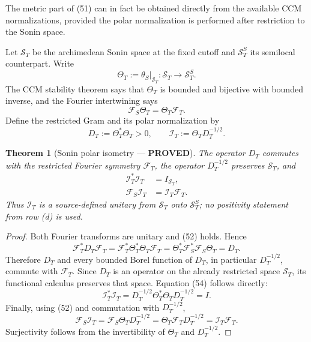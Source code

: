 \documentclass[11pt]{article}
\newtheorem{theorem}{Theorem}
\newcommand{\PROVED}{\textcolor{green!45!black}{\textbf{PROVED}}}
\begin{document}
The metric part of (51) can in fact be obtained directly from the available
CCM normalizations, provided the polar normalization is performed after
restriction to the Sonin space.

Let $\mathcal S_T$ be the archimedean Sonin space at the fixed cutoff and
$\mathcal S_T^S$ its semilocal counterpart.  Write
\[
 \Theta_T:=\theta_S|_{\mathcal S_T}:\mathcal S_T
 \longrightarrow\mathcal S_T^S.
\]
The CCM stability theorem says that $\Theta_T$ is bounded and bijective with
bounded inverse, and the Fourier intertwining says
\begin{equation}
 \mathcal F_S\Theta_T=\Theta_T\mathcal F_T.              \tag{52}
\end{equation}
Define the restricted Gram and its polar normalization by
\begin{equation}
 D_T:=\Theta_T^*\Theta_T>0,\qquad
 \mathcal I_T:=\Theta_TD_T^{-1/2}.                       \tag{53}
\end{equation}

\begin{theorem}[Sonin polar isometry --- \PROVED]
The operator $D_T$ commutes with the restricted Fourier symmetry
$\mathcal F_T$, the operator $D_T^{-1/2}$ preserves $\mathcal S_T$, and
\begin{align}
 \mathcal I_T^*\mathcal I_T&=I_{\mathcal S_T},           \tag{54}\\
 \mathcal F_S\mathcal I_T&=\mathcal I_T\mathcal F_T.    \tag{55}
\end{align}
Thus $\mathcal I_T$ is a source-defined unitary from $\mathcal S_T$ onto
$\mathcal S_T^S$; no positivity statement from row (d) is used.
\end{theorem}

\begin{proof}
Both Fourier transforms are unitary and (52) holds.  Hence
\[
 \mathcal F_T^*D_T\mathcal F_T
 =\mathcal F_T^*\Theta_T^*\Theta_T\mathcal F_T
 =\Theta_T^*\mathcal F_S^*\mathcal F_S\Theta_T
 =D_T.
\]
Therefore $D_T$ and every bounded Borel function of $D_T$, in particular
$D_T^{-1/2}$, commute with $\mathcal F_T$.  Since $D_T$ is an operator on the
already restricted space $\mathcal S_T$, its functional calculus preserves
that space.  Equation (54) follows directly:
\[
 \mathcal I_T^*\mathcal I_T
 =D_T^{-1/2}\Theta_T^*\Theta_TD_T^{-1/2}=I.
\]
Finally, using (52) and commutation with $D_T^{-1/2}$,
\[
 \mathcal F_S\mathcal I_T
 =\mathcal F_S\Theta_TD_T^{-1/2}
 =\Theta_T\mathcal F_TD_T^{-1/2}
 =\mathcal I_T\mathcal F_T.
\]
Surjectivity follows from the invertibility of $\Theta_T$ and $D_T^{-1/2}$.
\end{proof}
\end{document}
